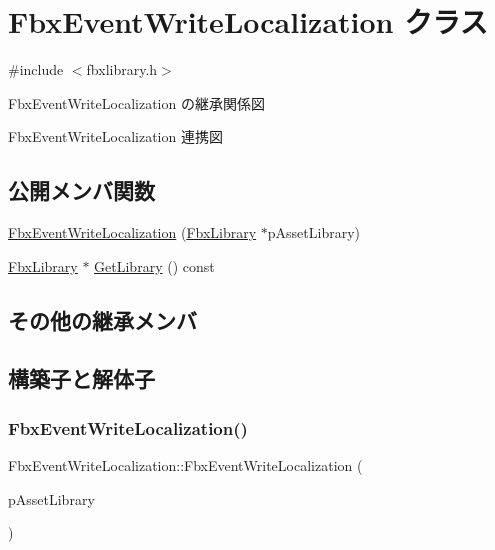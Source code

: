 \hypertarget{class_fbx_event_write_localization}{}\section{Fbx\+Event\+Write\+Localization クラス}
\label{class_fbx_event_write_localization}


{\ttfamily \#include $<$fbxlibrary.\+h$>$}



Fbx\+Event\+Write\+Localization の継承関係図


Fbx\+Event\+Write\+Localization 連携図
\subsection*{公開メンバ関数}
\begin{DoxyCompactItemize}
\item 
\hyperlink{class_fbx_event_write_localization_a45873b27b60b583b9e2d658fd6ba0916}{Fbx\+Event\+Write\+Localization} (\hyperlink{class_fbx_library}{Fbx\+Library} $\ast$p\+Asset\+Library)
\item 
\hyperlink{class_fbx_library}{Fbx\+Library} $\ast$ \hyperlink{class_fbx_event_write_localization_a10110bc0d52be7ba742c5c83c917c40c}{Get\+Library} () const
\end{DoxyCompactItemize}
\subsection*{その他の継承メンバ}


\subsection{構築子と解体子}
\mbox{\label{class_fbx_event_write_localization_a45873b27b60b583b9e2d658fd6ba0916}} 
\subsubsection{\texorpdfstring{Fbx\+Event\+Write\+Localization()}{FbxEventWriteLocalization()}}
{\footnotesize\ttfamily Fbx\+Event\+Write\+Localization\+::\+Fbx\+Event\+Write\+Localization (\begin{DoxyParamCaption}\item[{\hyperlink{class_fbx_library}{Fbx\+Library} $\ast$}]{p\+Asset\+Library }\end{DoxyParamCaption})}



